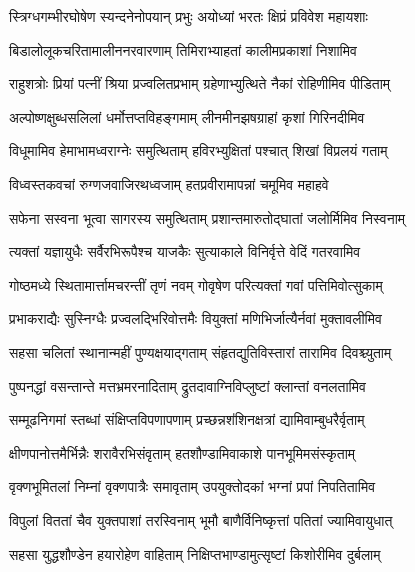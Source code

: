 
\twolineshloka
{स्त्रिग्धगम्भीरघोषेण स्यन्दनेनोपयान् प्रभुः}
{अयोध्यां भरतः क्षिप्रं प्रविवेश महायशाः} %

\twolineshloka
{बिडालोलूकचरितामालीननरवारणाम्}
{तिमिराभ्याहतां कालीमप्रकाशां निशामिव} %

\twolineshloka
{राहुशत्रोः प्रियां पत्नीं श्रिया प्रज्वलितप्रभाम्}
{ग्रहेणाभ्युत्थिते नैकां रोहिणीमिव पीडिताम्} %

\twolineshloka
{अल्पोष्णक्षुब्धसलिलां धर्मोत्तप्तविहङ्गमाम्}
{लीनमीनझषग्राहां कृशां गिरिनदीमिव} %

\twolineshloka
{विधूमामिव हेमाभामध्वराग्नेः समुत्थिताम्}
{हविरभ्युक्षितां पश्चात् शिखां विप्रलयं गताम्} %

\twolineshloka
{विध्वस्तकवचां रुग्णजवाजिरथध्वजाम्}
{हतप्रवीरामापन्नां चमूमिव महाहवे} %

\twolineshloka
{सफेना सस्वना भूत्वा सागरस्य समुत्थिताम्}
{प्रशान्तमारुतोद्घातां जलोर्मिमिव निस्वनाम्} %

\twolineshloka
{त्यक्तां यज्ञायुधैः सर्वैरभिरूपैश्च याजकैः}
{सुत्याकाले विनिर्वृत्ते वेदिं गतरवामिव} %

\twolineshloka
{गोष्ठमध्ये स्थितामार्त्तामचरन्तीं तृणं नवम्}
{गोवृषेण परित्यक्तां गवां पत्तिमिवोत्सुकाम्} %

\twolineshloka
{प्रभाकराद्यैः सुस्निग्धैः प्रज्वलद्भिरिवोत्तमैः}
{वियुक्तां मणिभिर्जात्यैर्नवां मुक्तावलीमिव} %

\twolineshloka
{सहसा चलितां स्थानान्महीं पुण्यक्षयाद्गताम्}
{संहृतद्युतिविस्तारां तारामिव दिवश्च्युताम्} %

\twolineshloka
{पुष्पनद्धां वसन्तान्ते मत्तभ्रमरनादिताम्}
{द्रुतदावाग्निविप्लुष्टां क्लान्तां वनलतामिव} %

\twolineshloka
{सम्मूढनिगमां स्तब्धां संक्षिप्तविपणापणाम्}
{प्रच्छन्नशऺशिनक्षत्रां द्यामिवाम्बुधरैर्वृताम्} %

\twolineshloka
{क्षीणपानोत्तमैर्भिन्नैः शरावैरभिसंवृताम्}
{हतशौण्डामिवाकाशे पानभूमिमसंस्कृताम्} %

\twolineshloka
{वृक्णभूमितलां निम्नां वृक्णपात्रैः समावृताम्}
{उपयुक्तोदकां भग्नां प्रपां निपतितामिव} %

\twolineshloka
{विपुलां विततां चैव युक्तपाशां तरस्विनाम्}
{भूमौ बाणैर्विनिष्कृत्तां पतितां ज्यामिवायुधात्} %

\twolineshloka
{सहसा युद्धशौण्डेन हयारोहेण वाहिताम्}
{निक्षिप्तभाण्डामुत्सृष्टां किशोरीमिव दुर्बलाम्} %

